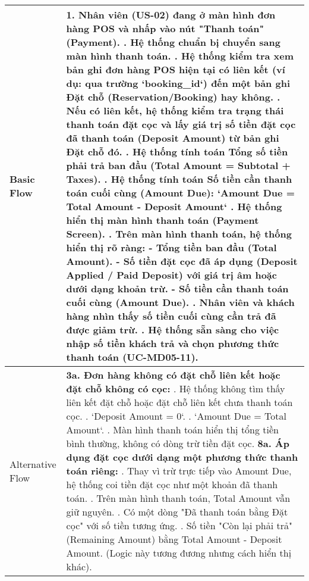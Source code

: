 \begin{longtable}{|m{4cm}|p{11cm}|}
Basic Flow & 1. Nhân viên (US-02) đang ở màn hình đơn hàng POS và nhấp vào nút "Thanh toán" (Payment). \newline 2. Hệ thống chuẩn bị chuyển sang màn hình thanh toán. \newline 3. Hệ thống kiểm tra xem bản ghi đơn hàng POS hiện tại có liên kết (ví dụ: qua trường `booking\_id`) đến một bản ghi Đặt chỗ (Reservation/Booking) hay không. \newline 4. Nếu có liên kết, hệ thống kiểm tra trạng thái thanh toán đặt cọc và lấy giá trị số tiền đặt cọc đã thanh toán (Deposit Amount) từ bản ghi Đặt chỗ đó. \newline 5. Hệ thống tính toán Tổng số tiền phải trả ban đầu (Total Amount = Subtotal + Taxes). \newline 6. Hệ thống tính toán Số tiền cần thanh toán cuối cùng (Amount Due): \newline    `Amount Due = Total Amount - Deposit Amount` \newline 7. Hệ thống hiển thị màn hình thanh toán (Payment Screen). \newline 8. Trên màn hình thanh toán, hệ thống hiển thị rõ ràng: \newline    - Tổng tiền ban đầu (Total Amount). \newline    - Số tiền đặt cọc đã áp dụng (Deposit Applied / Paid Deposit) với giá trị âm hoặc dưới dạng khoản trừ. \newline    - Số tiền cần thanh toán cuối cùng (Amount Due). \newline 9. Nhân viên và khách hàng nhìn thấy số tiền cuối cùng cần trả đã được giảm trừ. \newline 10. Hệ thống sẵn sàng cho việc nhập số tiền khách trả và chọn phương thức thanh toán (UC-MD05-11). \\
\hline
Alternative Flow & \textbf{3a. Đơn hàng không có đặt chỗ liên kết hoặc đặt chỗ không có cọc:} \newline    1. Hệ thống không tìm thấy liên kết đặt chỗ hoặc đặt chỗ liên kết chưa thanh toán cọc. \newline    2. `Deposit Amount = 0`. \newline    3. `Amount Due = Total Amount`. \newline    4. Màn hình thanh toán hiển thị tổng tiền bình thường, không có dòng trừ tiền đặt cọc. \newline \textbf{8a. Áp dụng đặt cọc dưới dạng một phương thức thanh toán riêng:} \newline    1. Thay vì trừ trực tiếp vào Amount Due, hệ thống coi tiền đặt cọc như một khoản đã thanh toán. \newline    2. Trên màn hình thanh toán, Total Amount vẫn giữ nguyên. \newline    3. Có một dòng "Đã thanh toán bằng Đặt cọc" với số tiền tương ứng. \newline    4. Số tiền "Còn lại phải trả" (Remaining Amount) bằng Total Amount - Deposit Amount. (Logic này tương đương nhưng cách hiển thị khác). \\

\end{longtable}
